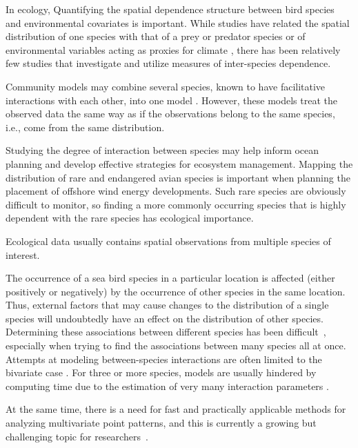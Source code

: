 \documentclass{statsoc}
\begin{document}
In ecology,
Quantifying the spatial dependence structure between bird species and environmental covariates is important. While studies have related the spatial distribution of one species with that of a prey or predator species or of environmental variables acting as proxies for climate \citep{Goyert2014, Goyert2016}, there has been relatively few studies that investigate and utilize measures of inter-species dependence.

Community models may combine several species, known to have facilitative interactions with each other, into one model \citep{Goyert2016, Sollmann2016}. However, these models treat the observed data the same way as if the observations belong to the same species, i.e., come from the same distribution.



Studying the degree of interaction between species may help inform ocean planning and develop effective strategies for ecosystem management. Mapping the distribution of rare and endangered avian species is important when planning the placement of offshore wind energy developments. Such rare species are obviously difficult to monitor, so finding a more commonly occurring species that is highly dependent with the rare species has ecological importance.






Ecological data usually contains spatial observations from multiple species of interest. 







The occurrence of a sea bird species in a particular location is affected (either positively or negatively) by the occurrence of other species in the same location. 
Thus, external factors that may cause changes to the distribution of a single species will undoubtedly have an effect on the distribution of other species. 
Determining these associations between different species has been difficult~\citep{Stachowicz2001}, especially when trying to find the associations between many species all at once.
Attempts at modeling between-species interactions are often limited to the bivariate case \citep{Andersen1992, Nightingale2015}. For three or more species, models are usually hindered by computing time due to the estimation of very many interaction parameters \citep{Jalilian2015}. 

At the same time, there is a need for fast and practically applicable methods for analyzing multivariate point patterns, and this is currently a growing but challenging topic for researchers~\citep{Moller2016}.
\end{document}
